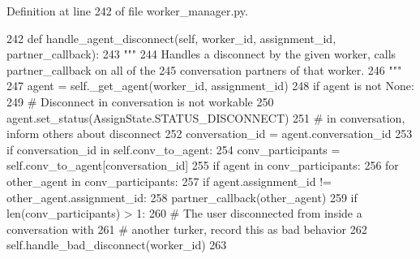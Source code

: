 Definition at line 242 of file worker\+\_\+manager.\+py.


\begin{DoxyCode}
242     \textcolor{keyword}{def }handle\_agent\_disconnect(self, worker\_id, assignment\_id, partner\_callback):
243         \textcolor{stringliteral}{"""}
244 \textcolor{stringliteral}{        Handles a disconnect by the given worker, calls partner\_callback on all of the}
245 \textcolor{stringliteral}{        conversation partners of that worker.}
246 \textcolor{stringliteral}{        """}
247         agent = self.\_get\_agent(worker\_id, assignment\_id)
248         \textcolor{keywordflow}{if} agent \textcolor{keywordflow}{is} \textcolor{keywordflow}{not} \textcolor{keywordtype}{None}:
249             \textcolor{comment}{# Disconnect in conversation is not workable}
250             agent.set\_status(AssignState.STATUS\_DISCONNECT)
251             \textcolor{comment}{# in conversation, inform others about disconnect}
252             conversation\_id = agent.conversation\_id
253             \textcolor{keywordflow}{if} conversation\_id \textcolor{keywordflow}{in} self.conv\_to\_agent:
254                 conv\_participants = self.conv\_to\_agent[conversation\_id]
255                 \textcolor{keywordflow}{if} agent \textcolor{keywordflow}{in} conv\_participants:
256                     \textcolor{keywordflow}{for} other\_agent \textcolor{keywordflow}{in} conv\_participants:
257                         \textcolor{keywordflow}{if} agent.assignment\_id != other\_agent.assignment\_id:
258                             partner\_callback(other\_agent)
259                 \textcolor{keywordflow}{if} len(conv\_participants) > 1:
260                     \textcolor{comment}{# The user disconnected from inside a conversation with}
261                     \textcolor{comment}{# another turker, record this as bad behavior}
262                     self.handle\_bad\_disconnect(worker\_id)
263 
\end{DoxyCode}
\mbox{\label{classparlai_1_1mturk_1_1core_1_1worker__manager_1_1WorkerManager_ac75275d1b201b5bcbd8f23740b4e1080}} 
